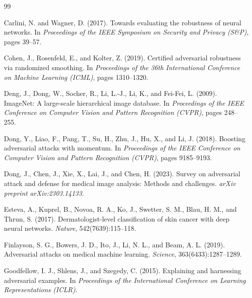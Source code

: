 \documentclass[12pt,a4paper,oneside]{report}
\begin{document}

\begin{thebibliography}{99}

Carlini, N. and Wagner, D. (2017).
\newblock Towards evaluating the robustness of neural networks.
\newblock In \emph{Proceedings of the IEEE Symposium on Security and Privacy (S\&P)}, pages 39--57.

Cohen, J., Rosenfeld, E., and Kolter, Z. (2019).
\newblock Certified adversarial robustness via randomized smoothing.
\newblock In \emph{Proceedings of the 36th International Conference on Machine Learning (ICML)}, pages 1310--1320.

Deng, J., Dong, W., Socher, R., Li, L.-J., Li, K., and Fei-Fei, L. (2009).
\newblock ImageNet: A large-scale hierarchical image database.
\newblock In \emph{Proceedings of the IEEE Conference on Computer Vision and Pattern Recognition (CVPR)}, pages 248--255.

Dong, Y., Liao, F., Pang, T., Su, H., Zhu, J., Hu, X., and Li, J. (2018).
\newblock Boosting adversarial attacks with momentum.
\newblock In \emph{Proceedings of the IEEE Conference on Computer Vision and Pattern Recognition (CVPR)}, pages 9185--9193.

Dong, J., Chen, J., Xie, X., Lai, J., and Chen, H. (2023).
\newblock Survey on adversarial attack and defense for medical image analysis: Methods and challenges.
\newblock \emph{arXiv preprint arXiv:2303.14133}.

Esteva, A., Kuprel, B., Novoa, R. A., Ko, J., Swetter, S. M., Blau, H. M., and Thrun, S. (2017).
\newblock Dermatologist-level classification of skin cancer with deep neural networks.
\newblock \emph{Nature}, 542(7639):115--118.

Finlayson, S. G., Bowers, J. D., Ito, J., Li, N. L., and Beam, A. L. (2019).
\newblock Adversarial attacks on medical machine learning.
\newblock \emph{Science}, 363(6433):1287--1289.

Goodfellow, I. J., Shlens, J., and Szegedy, C. (2015).
\newblock Explaining and harnessing adversarial examples.
\newblock In \emph{Proceedings of the International Conference on Learning Representations (ICLR)}.


\end{thebibliography}
\end{document}
